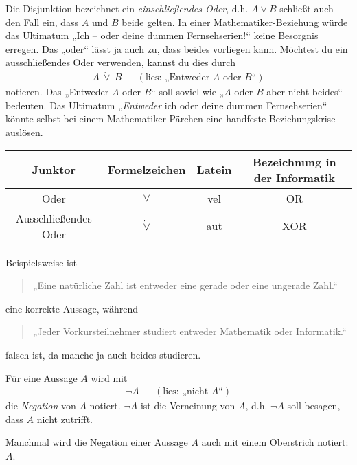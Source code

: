	
\begin{bem} \label{entwederoder}
    Die Disjunktion bezeichnet ein \emph{einschließendes Oder}, d.h. $A\lor B$ schließt auch den Fall ein, dass $A$ und $B$ beide gelten. In einer Mathematiker-Beziehung würde das Ultimatum „Ich -- oder deine dummen Fernsehserien!“ keine Besorgnis erregen. Das „oder“ lässt ja auch zu, dass beides vorliegen kann. Möchtest du ein ausschließendes Oder verwenden, kannst du dies durch
    \begin{align*}
        A\ \dot\lor\ B && (\text{lies: „Entweder $A$ oder $B$“})
    \end{align*}
    notieren. Das „Entweder $A$ oder $B$“ soll soviel wie „$A$ oder $B$ aber nicht beides“ bedeuten. Das Ultimatum „\emph{Entweder} ich oder deine dummen Fernsehserien“ könnte selbst bei einem Mathematiker-Pärchen eine handfeste Beziehungskrise auslösen.
    \begin{center}
    \begin{tabular}{cccc}
        Junktor &  Formelzeichen & Latein & Bezeichnung in der Informatik \\
        \midrule
        Oder &  $\lor$ & vel & OR \\
        Ausschließendes Oder & $\dot\lor$ & aut & XOR
    \end{tabular}
    \end{center}
\end{bem}


\begin{bsp}
    Beispielsweise ist
    \begin{quote}
        „Eine natürliche Zahl ist entweder eine gerade oder eine ungerade Zahl.“
    \end{quote}
    eine korrekte Aussage, während
    \begin{quote}
        „Jeder Vorkursteilnehmer studiert entweder Mathematik oder Informatik.“
    \end{quote}
    falsch ist, da manche ja auch beides studieren.
\end{bsp}


\begin{defin}[Negation] 
    Für eine Aussage $A$ wird mit
    \begin{align*}
        \neg A   && (\text{lies: „nicht $A$“})
    \end{align*}
    die \emph{Negation} von $A$ notiert. $\neg A$ ist die Verneinung von $A$, d.h. $\neg A$ soll besagen, dass $A$ nicht zutrifft.
    
    Manchmal wird die Negation einer Aussage $A$ auch mit einem Oberstrich notiert: $\overline{A}$.
\end{defin}


